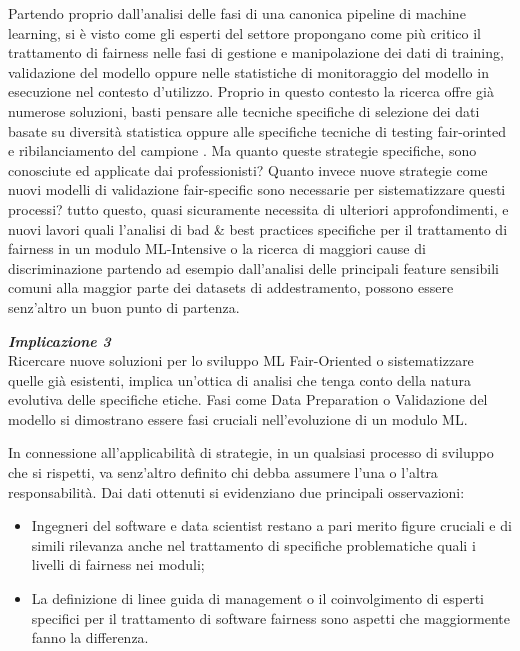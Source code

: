     Partendo proprio dall'analisi delle fasi di una canonica pipeline di machine learning, si è visto come gli esperti del settore propongano come più critico il trattamento di fairness nelle fasi di gestione e manipolazione dei dati di training, validazione del modello oppure nelle statistiche di monitoraggio del modello in esecuzione nel contesto d'utilizzo. Proprio in questo contesto la ricerca offre già numerose soluzioni, basti pensare alle tecniche specifiche di selezione dei dati basate su diversità statistica \cite{moumoulidou2020diverse} oppure alle specifiche tecniche di testing fair-orinted e ribilanciamento del campione \cite{galhotra2017fairness}. Ma quanto queste strategie specifiche, sono conosciute ed applicate dai professionisti? Quanto invece nuove strategie come nuovi modelli di validazione fair-specific sono necessarie per sistematizzare questi processi? tutto questo, quasi sicuramente necessita di ulteriori approfondimenti, e nuovi lavori quali l'analisi di bad \& best practices specifiche per il trattamento di fairness in un modulo ML-Intensive o la ricerca di maggiori cause di discriminazione partendo ad esempio dall'analisi delle principali feature sensibili comuni alla maggior parte dei datasets di addestramento, possono essere senz'altro un buon punto di partenza.
    
    \begin{center}
	
        \begin{tcolorbox}[width=\textwidth, colframe=black, colback=perla]
    			\begin{minipage}{\textwidth}
    				\textit{\faCaretSquareORight  \textbf{ Implicazione 3}}\\
    		    Ricercare nuove soluzioni per lo sviluppo ML Fair-Oriented o sistematizzare quelle già esistenti, implica un'ottica di analisi che tenga conto della natura evolutiva delle specifiche etiche. Fasi come Data Preparation o Validazione del modello si dimostrano essere fasi cruciali nell'evoluzione di un modulo ML.
    			\end{minipage}
		\end{tcolorbox}
	\end{center}
    
    In connessione all'applicabilità di strategie, in un qualsiasi processo di sviluppo che si rispetti, va senz'altro definito chi debba assumere l'una o l'altra responsabilità. Dai dati ottenuti si evidenziano due principali osservazioni:
    \begin{itemize}
        \item  Ingegneri del software e data scientist restano a pari merito figure cruciali e di simili rilevanza anche nel trattamento di specifiche problematiche quali i livelli di fairness nei moduli;
        \item La definizione di linee guida di management o il coinvolgimento di esperti specifici per il trattamento di software fairness sono aspetti che maggiormente fanno la differenza.
    \end{itemize}
    
